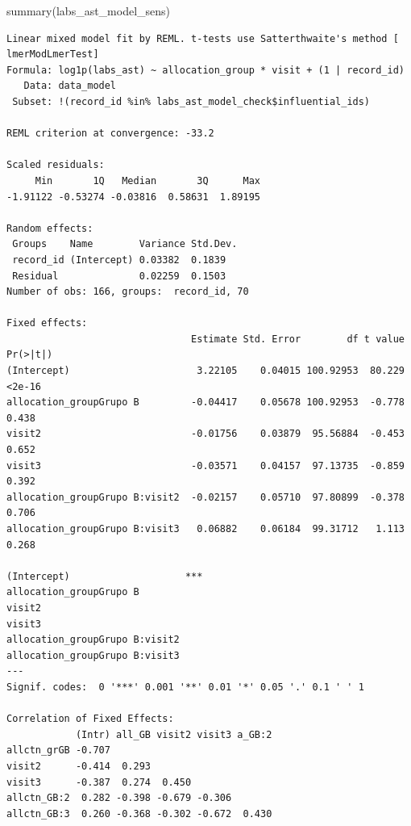 \documentclass[
  letterpaper,
  DIV=11,
  numbers=noendperiod]{scrartcl}
\newenvironment{Shaded}{\begin{snugshade}}{\end{snugshade}}
\newcommand{\FunctionTok}[1]{\textcolor[rgb]{0.28,0.35,0.67}{#1}}
\newcommand{\NormalTok}[1]{\textcolor[rgb]{0.00,0.23,0.31}{#1}}
\newcommand{\SpecialCharTok}[1]{\textcolor[rgb]{0.37,0.37,0.37}{#1}}
\begin{document}
\begin{Shaded}
\begin{Highlighting}[]
\FunctionTok{summary}\NormalTok{(labs\_ast\_model\_sens)}
\end{Highlighting}
\end{Shaded}

\begin{verbatim}
Linear mixed model fit by REML. t-tests use Satterthwaite's method [
lmerModLmerTest]
Formula: log1p(labs_ast) ~ allocation_group * visit + (1 | record_id)
   Data: data_model
 Subset: !(record_id %in% labs_ast_model_check$influential_ids)

REML criterion at convergence: -33.2

Scaled residuals: 
     Min       1Q   Median       3Q      Max 
-1.91122 -0.53274 -0.03816  0.58631  1.89195 

Random effects:
 Groups    Name        Variance Std.Dev.
 record_id (Intercept) 0.03382  0.1839  
 Residual              0.02259  0.1503  
Number of obs: 166, groups:  record_id, 70

Fixed effects:
                                Estimate Std. Error        df t value Pr(>|t|)
(Intercept)                      3.22105    0.04015 100.92953  80.229   <2e-16
allocation_groupGrupo B         -0.04417    0.05678 100.92953  -0.778    0.438
visit2                          -0.01756    0.03879  95.56884  -0.453    0.652
visit3                          -0.03571    0.04157  97.13735  -0.859    0.392
allocation_groupGrupo B:visit2  -0.02157    0.05710  97.80899  -0.378    0.706
allocation_groupGrupo B:visit3   0.06882    0.06184  99.31712   1.113    0.268
                                  
(Intercept)                    ***
allocation_groupGrupo B           
visit2                            
visit3                            
allocation_groupGrupo B:visit2    
allocation_groupGrupo B:visit3    
---
Signif. codes:  0 '***' 0.001 '**' 0.01 '*' 0.05 '.' 0.1 ' ' 1

Correlation of Fixed Effects:
            (Intr) all_GB visit2 visit3 a_GB:2
allctn_grGB -0.707                            
visit2      -0.414  0.293                     
visit3      -0.387  0.274  0.450              
allctn_GB:2  0.282 -0.398 -0.679 -0.306       
allctn_GB:3  0.260 -0.368 -0.302 -0.672  0.430
\end{verbatim}

\begin{Shaded}
\end{Shaded}
\end{document}
